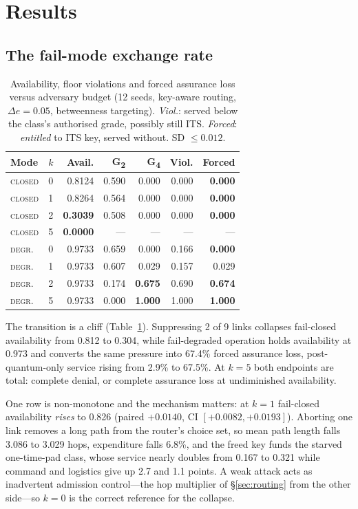 \documentclass[conference]{IEEEtran}
\newcommand{\GII}{G\textsubscript{2}}
\newcommand{\GIV}{G\textsubscript{4}}
\begin{document}
\section{Results}
\subsection{The fail-mode exchange rate}\label{sec:head}
\begin{table}[t]
\caption{Availability, floor violations and forced assurance loss versus adversary
budget (12 seeds, key-aware routing, $\Delta e=0.05$, betweenness targeting).
\emph{Viol.}: served below the class's authorised grade, possibly still ITS.
\emph{Forced}: \emph{entitled} to ITS key, served without. SD $\le0.012$.}
\label{tab:head}
\centering\footnotesize
\begin{tabular}{@{}llrrrrr@{}}
\toprule
Mode & $k$ & Avail. & \GII & \GIV & Viol. & Forced\\
\midrule
\textsc{closed} & 0 & 0.8124 & 0.590 & 0.000 & 0.000 & \textbf{0.000}\\
\textsc{closed} & 1 & 0.8264 & 0.564 & 0.000 & 0.000 & \textbf{0.000}\\
\textsc{closed} & 2 & \textbf{0.3039} & 0.508 & 0.000 & 0.000 & \textbf{0.000}\\
\textsc{closed} & 5 & \textbf{0.0000} & --- & --- & --- & ---\\
\textsc{degr.}  & 0 & 0.9733 & 0.659 & 0.000 & 0.166 & \textbf{0.000}\\
\textsc{degr.}  & 1 & 0.9733 & 0.607 & 0.029 & 0.157 & 0.029\\
\textsc{degr.}  & 2 & 0.9733 & 0.174 & \textbf{0.675} & 0.690 & \textbf{0.674}\\
\textsc{degr.}  & 5 & 0.9733 & 0.000 & \textbf{1.000} & 1.000 & \textbf{1.000}\\
\bottomrule
\end{tabular}
\end{table}

The transition is a cliff (Table~\ref{tab:head}). Suppressing 2 of 9 links
collapses fail-closed availability from 0.812 to 0.304, while fail-degraded
operation holds availability at 0.973 and converts the same pressure into 67.4\%
forced assurance loss, post-quantum-only service rising from 2.9\% to 67.5\%. At
$k=5$ both endpoints are total: complete denial, or complete assurance loss at
undiminished availability.

One row is non-monotone and the mechanism matters: at $k=1$ fail-closed availability
\emph{rises} to 0.826 (paired $+0.0140$, CI $[+0.0082,+0.0193]$). Aborting one link
removes a long path from the router's choice set, so mean path length falls 3.086 to
3.029 hops, expenditure falls 6.8\%, and the freed key funds the starved one-time-pad
class, whose service nearly doubles from 0.167 to 0.321 while command and logistics
give up 2.7 and 1.1 points. A weak attack acts as inadvertent admission
control---the hop multiplier of \S\ref{sec:routing} from the other side---so $k=0$ is
the correct reference for the collapse.
\end{document}
